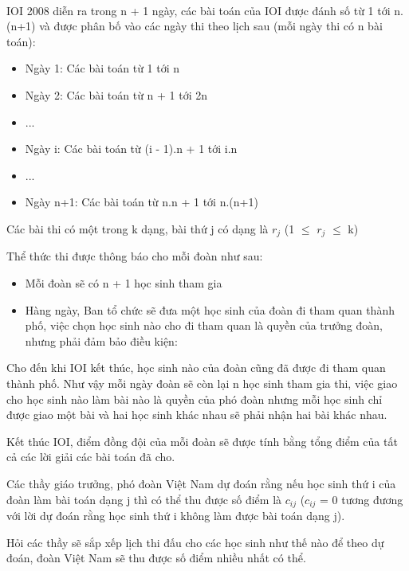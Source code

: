  

IOI 2008 diễn ra trong n + 1 ngày, các bài toán của IOI được đánh số từ 1 tới n.(n+1) và được phân bố vào các ngày thi theo lịch sau (mỗi ngày thi có n bài toán):
\begin{itemize}
	\item Ngày 1: Các bài toán từ 1 tới n
	\item Ngày 2: Các bài toán từ n + 1 tới 2n
	\item ...
	\item Ngày i: Các bài toán từ (i - 1).n + 1 tới i.n
	\item ...
	\item Ngày n+1: Các bài toán từ n.n + 1 tới n.(n+1)
\end{itemize}

Các bài thi có một trong k dạng, bài thứ j có dạng là $r_{j}$ (1  $\le$  $r_{j}$  $\le$  k)

Thể thức thi được thông báo cho mỗi đoàn như sau:
\begin{itemize}
	\item Mỗi đoàn sẽ có n + 1 học sinh tham gia
	\item Hàng ngày, Ban tổ chức sẽ đưa một học sinh của đoàn đi tham quan thành phố, việc chọn học sinh nào cho đi tham quan là quyền của trưởng đoàn, nhưng phải đảm bảo điều kiện:
\end{itemize}

Cho đến khi IOI kết thúc, học sinh nào của đoàn cũng đã được đi tham quan thành phố. Như vậy mỗi ngày đoàn sẽ còn lại n học sinh tham gia thi, việc giao cho học sinh nào làm bài nào là quyền của phó đoàn nhưng mỗi học sinh chỉ được giao một bài và hai học sinh khác nhau sẽ phải nhận hai bài khác nhau.

Kết thúc IOI, điểm đồng đội của mỗi đoàn sẽ được tính bằng tổng điểm của tất cả các lời giải các bài toán đã cho.

Các thầy giáo trưởng, phó đoàn Việt Nam dự đoán rằng nếu học sinh thứ i của đoàn làm bài toán dạng j thì có thể thu được số điểm là $c_{ij}$ ($c_{ij}$ = 0 tương đương với lời dự đoán rằng học sinh thứ i không làm được bài toán dạng j).

Hỏi các thầy sẽ sắp xếp lịch thi đấu cho các học sinh như thế nào để theo dự đoán, đoàn Việt Nam sẽ thu được số điểm nhiều nhất có thể.